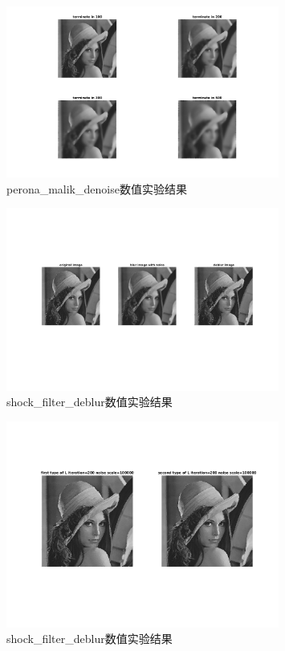 \documentclass[a4paper, UTF8]{ctexrep}
\begin{document}
				\begin{figure}[htbp!]
					\centering
					\includegraphics[width=0.8\textwidth]{hw2_fig4.png}
					\caption{perona\_malik\_denoise数值实验结果}
					\label{}
				\end{figure}
				\begin{figure}[htbp!]
					\centering
					\includegraphics[width=0.8\textwidth]{hw2_fig5.png}
					\caption{shock\_filter\_deblur数值实验结果}
					\label{}
				\end{figure}
				\begin{figure}[htbp!]
					\centering
					\includegraphics[width=0.8\textwidth]{hw2_fig6.png}
					\caption{shock\_filter\_deblur数值实验结果}
					\label{}
				\end{figure}
\end{document}
